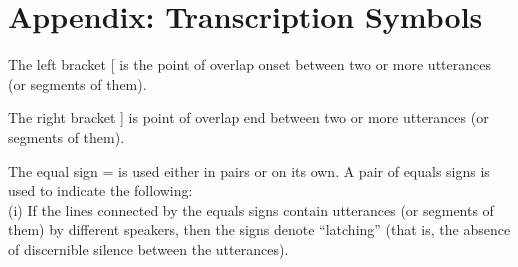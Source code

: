 \documentclass[output=paper]{LSP/langsci}
\begin{document}
\section*{Appendix: Transcription Symbols}
\begin{description}
\item 	The left bracket [ is the point of overlap onset between two or more utterances (or segments of them).
\item  The right bracket ] is point of overlap end between two or more utterances (or segments of them).
\item   The equal sign = is used either in pairs or on its own. A pair of equals signs is used to indicate the following:\\
(i) If the lines connected by the equals signs contain utterances (or segments of them) by different speakers, then the signs denote ``latching'' (that is, the absence of discernible silence between the utterances). 


\end{description}
\end{document}
